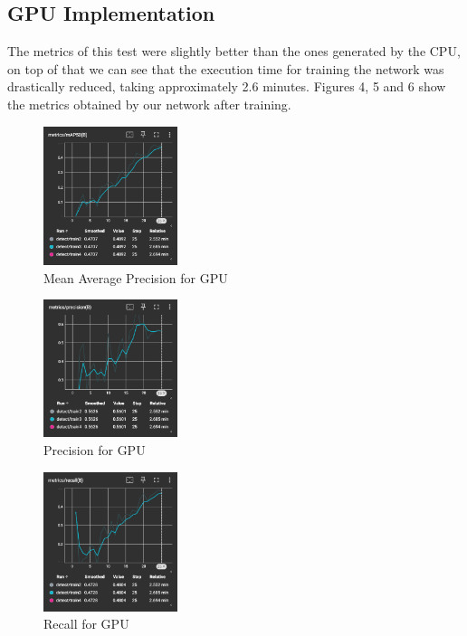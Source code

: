 \documentclass[conference]{IEEEtran}
\begin{document}
\subsection{GPU Implementation}
The metrics of this test were slightly better than the ones generated by the CPU, on top of that we can see that the execution time for training the network was drastically reduced, taking approximately 2.6 minutes. Figures 4, 5 and 6 show the metrics obtained by our network after training.
\begin{figure}[ht!]
    \centering
    \includegraphics[width=0.35\textwidth]{Images/GPU/Screenshot 2024-01-27 182452.png}
    \caption{Mean Average Precision for GPU}\label{fig:GPUmAP}
\end{figure}

\begin{figure}[ht!]
    \centering
    \includegraphics[width=0.35\textwidth]{Images/GPU/Screenshot 2024-01-27 182658.png}
    \caption{Precision for GPU}\label{fig:GPUprecision}
\end{figure}

\begin{figure}[ht!]
    \centering
    \includegraphics[width=0.35\textwidth]{Images/GPU/Screenshot 2024-01-27 182608.png}
    \caption{Recall for GPU}\label{fig:GPUrecall}
\end{figure}
\end{document}
